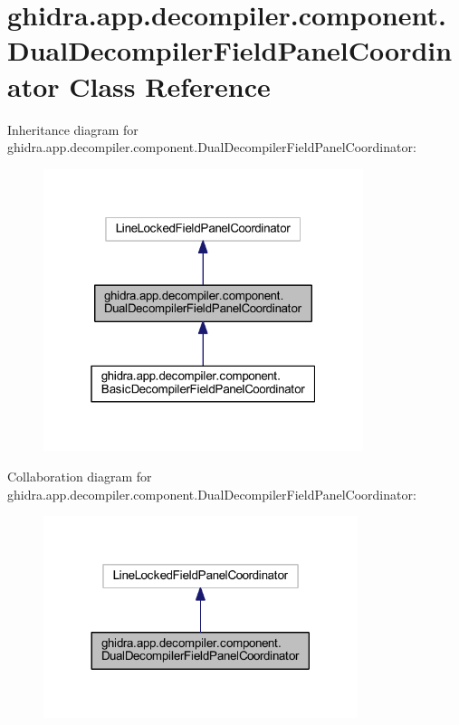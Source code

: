 \hypertarget{classghidra_1_1app_1_1decompiler_1_1component_1_1_dual_decompiler_field_panel_coordinator}{}\section{ghidra.\+app.\+decompiler.\+component.\+Dual\+Decompiler\+Field\+Panel\+Coordinator Class Reference}
\label{classghidra_1_1app_1_1decompiler_1_1component_1_1_dual_decompiler_field_panel_coordinator}


Inheritance diagram for ghidra.\+app.\+decompiler.\+component.\+Dual\+Decompiler\+Field\+Panel\+Coordinator\+:
\nopagebreak
\begin{figure}[H]
\begin{center}
\leavevmode
\includegraphics[width=265pt]{classghidra_1_1app_1_1decompiler_1_1component_1_1_dual_decompiler_field_panel_coordinator__inherit__graph}
\end{center}
\end{figure}


Collaboration diagram for ghidra.\+app.\+decompiler.\+component.\+Dual\+Decompiler\+Field\+Panel\+Coordinator\+:
\nopagebreak
\begin{figure}[H]
\begin{center}
\leavevmode
\includegraphics[width=260pt]{classghidra_1_1app_1_1decompiler_1_1component_1_1_dual_decompiler_field_panel_coordinator__coll__graph}
\end{center}
\end{figure}
